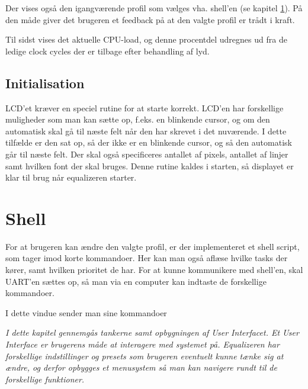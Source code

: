 
Der vises også den igangværende profil som vælges vha. shell'en (se kapitel \ref{sec:shell}). På den måde giver det brugeren et feedback på at den valgte profil er trådt i kraft. 

Til sidst vises det aktuelle CPU-load, og denne procentdel udregnes ud fra de ledige clock cycles der er tilbage efter behandling af lyd. 

\subsection{Initialisation}
LCD'et kræver en speciel rutine for at starte korrekt. LCD'en har forskellige muligheder som man kan sætte op, f.eks. en blinkende cursor, og om den automatisk skal gå til næste felt når den har skrevet i det nuværende. I dette tilfælde er den sat op, så der ikke er en blinkende cursor, og så den automatisk går til næste felt. Der skal også specificeres antallet af pixels, antallet af linjer samt hvilken font der skal bruges. Denne rutine kaldes i starten, så displayet er klar til brug når equalizeren starter. 

\section{Shell}\label{sec:shell}
For at brugeren kan ændre den valgte profil, er der implementeret et shell script, som tager imod korte kommandoer. Her kan man også aflæse hvilke tasks der kører, samt hvilken prioritet de har. For at kunne kommunikere med shell'en, skal UART'en sættes op, så man via en computer kan indtaste de forskellige kommandoer. 


I dette vindue sender man sine kommandoer 

\emph{I dette kapitel gennemgås tankerne samt opbygningen af User Interfacet. Et User Interface er brugerens måde at interagere med systemet på. Equalizeren har forskellige indstillinger og presets som brugeren eventuelt kunne tænke sig at ændre, og derfor opbygges et menusystem så man kan navigere rundt til de forskellige funktioner.}


